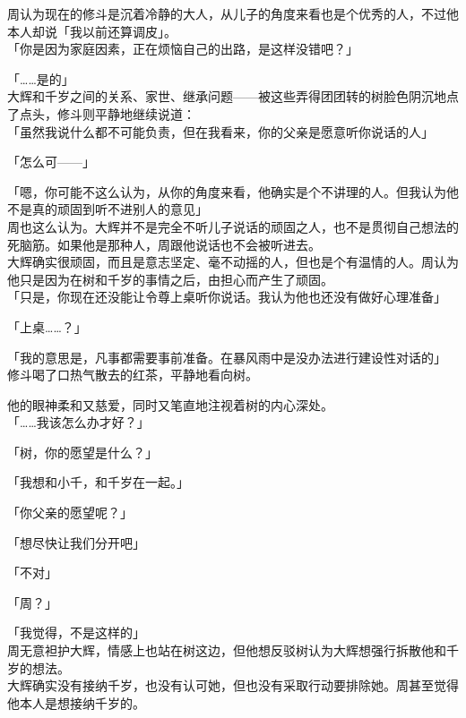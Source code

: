 周认为现在的修斗是沉着冷静的大人，从儿子的角度来看也是个优秀的人，不过他本人却说「我以前还算调皮」。\\

「你是因为家庭因素，正在烦恼自己的出路，是这样没错吧？」

「……是的」\\

大辉和千岁之间的关系、家世、继承问题——被这些弄得团团转的树脸色阴沉地点了点头，修斗则平静地继续说道：\\

「虽然我说什么都不可能负责，但在我看来，你的父亲是愿意听你说话的人」

「怎么可——」

「嗯，你可能不这么认为，从你的角度来看，他确实是个不讲理的人。但我认为他不是真的顽固到听不进别人的意见」\\

周也这么认为。大辉并不是完全不听儿子说话的顽固之人，也不是贯彻自己想法的死脑筋。如果他是那种人，周跟他说话也不会被听进去。\\

大辉确实很顽固，而且是意志坚定、毫不动摇的人，但也是个有温情的人。周认为他只是因为在树和千岁的事情之后，由担心而产生了顽固。\\

「只是，你现在还没能让令尊上桌听你说话。我认为他也还没有做好心理准备」

「上桌……？」

「我的意思是，凡事都需要事前准备。在暴风雨中是没办法进行建设性对话的」\\

修斗喝了口热气散去的红茶，平静地看向树。

他的眼神柔和又慈爱，同时又笔直地注视着树的内心深处。\\

「……我该怎么办才好？」

「树，你的愿望是什么？」

「我想和小千，和千岁在一起。」

「你父亲的愿望呢？」

「想尽快让我们分开吧」

「不对」

「周？」

「我觉得，不是这样的」\\

周无意袒护大辉，情感上也站在树这边，但他想反驳树认为大辉想强行拆散他和千岁的想法。\\

大辉确实没有接纳千岁，也没有认可她，但也没有采取行动要排除她。周甚至觉得他本人是想接纳千岁的。\\

